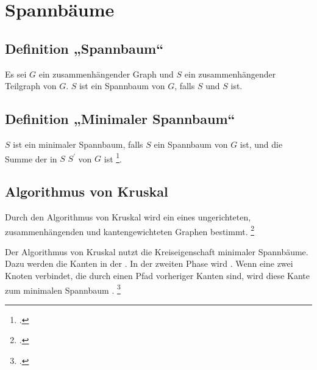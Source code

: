 \documentclass{bschlangaul-theorie}
\begin{document}

\chapter{Spannbäume}

%

\section{Definition „Spannbaum“}

Es sei $G$ ein zusammenhängender Graph und $S$ ein zusammenhängender
Teilgraph von $G$. $S$ ist ein Spannbaum von $G$, falls $S$  und $S$  ist.

%

\section{Definition „Minimaler Spannbaum“}

$S$ ist ein minimaler Spannbaum, falls $S$ ein Spannbaum von $G$ ist,
und die Summe der  in $S$  $S^\prime$ von $G$ ist
\footcite[Seite 29]{aud:fs:6}.

%

\section{Algorithmus von Kruskal}

Durch den Algorithmus von Kruskal wird ein 
eines ungerichteten, zusammenhängenden und kantengewichteten Graphen
bestimmt.
\footcite[Seite 30 (PDF 24)]{aud:fs:6}

Der Algorithmus von Kruskal nutzt die Kreiseigenschaft minimaler
Spannbäume. Dazu werden die Kanten in der 
. In der zweiten Phase
wird . Wenn eine
 zwei Knoten verbindet, die  durch einen
Pfad vorheriger Kanten  sind, wird diese Kante zum
minimalen Spannbaum .
\footcite{wiki:kruskal}
\end{document}
